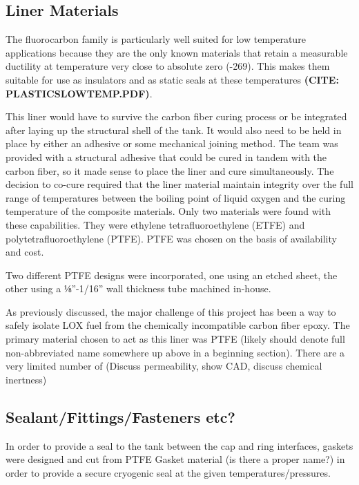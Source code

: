 \subsection{Liner Materials}


 The fluorocarbon family is particularly well suited for low temperature applications because they are the only known materials that retain a measurable ductility at temperature very close to absolute zero (-269\celsius). This makes them suitable for use as insulators and as static seals at these temperatures \textbf{(CITE: PLASTICSLOWTEMP.PDF)}.
 
 This liner would have to survive the carbon fiber curing process or be integrated after laying up the structural shell of the tank. It would also need to be held in place by either an adhesive or some mechanical joining method. The team was provided with a structural adhesive that could be cured in tandem with the carbon fiber, so it made sense to place the liner and cure simultaneously. The decision to co-cure required that the liner material maintain integrity over the full range of temperatures between the boiling point of liquid oxygen and the curing temperature of the composite materials. Only two materials were found with these capabilities. They were ethylene tetrafluoroethylene (ETFE) and polytetrafluoroethylene (PTFE). PTFE was chosen on the basis of availability and cost. 
     
Two different PTFE designs were incorporated, one using an etched sheet, the other using a ⅛”-1/16” wall thickness tube machined in-house.

As previously discussed, the major challenge of this project has been a way to safely isolate LOX fuel from the chemically incompatible carbon fiber epoxy.  The primary material chosen to act as this liner was PTFE (likely should denote full non-abbreviated name somewhere up above in a beginning section).  There are a very limited number of (Discuss permeability, show CAD, discuss chemical inertness)


\subsection{Sealant/Fittings/Fasteners etc?}


In order to provide a seal to the tank between the cap and ring interfaces, gaskets were designed and cut from PTFE Gasket material (is there a proper name?) in order to provide a secure cryogenic seal at the given temperatures/pressures.

\newpage